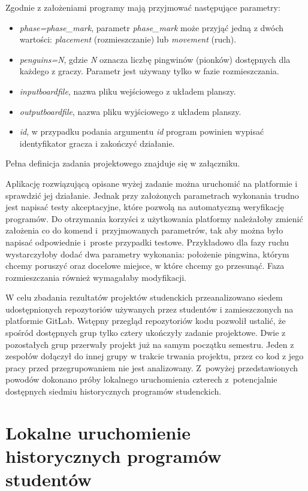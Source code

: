 Zgodnie z założeniami programy mają przyjmować następujące parametry:
\begin{itemize}
    \item \textit{phase=phase\_mark}, parametr \textit{phase\_mark} może przyjąć jedną z dwóch wartości: \textit{placement} (rozmieszczanie) lub \textit{movement} (ruch).
    \item \textit{penguins=N}, gdzie \textit{N} oznacza liczbę pingwinów (pionków) dostępnych dla każdego z graczy.
    Parametr jest używany tylko w fazie rozmieszczania.
    \item \textit{inputboardfile}, nazwa pliku wejściowego z układem planszy.
    \item \textit{outputboardfile}, nazwa pliku wyjściowego z układem planszy.
    \item \textit{id}, w przypadku podania argumentu \textit{id} program powinien wypisać identyfikator gracza i zakończyć działanie.
\end{itemize}
Pełna definicja zadania projektowego znajduje się w załączniku.

Aplikację rozwiązującą opisane wyżej zadanie można uruchomić na platformie i sprawdzić jej działanie.
Jednak przy założonych parametrach wykonania trudno jest napisać testy akceptacyjne, które pozwolą na automatyczną weryfikację programów.
Do otrzymania korzyści z użytkowania platformy należałoby zmienić założenia co do komend i~przyjmowanych parametrów, tak aby można było napisać odpowiednie i~proste przypadki testowe.
Przykładowo dla fazy ruchu wystarczyłoby dodać dwa parametry wykonania: położenie pingwina, którym chcemy poruszyć oraz docelowe miejsce, w które chcemy go przesunąć.
Faza rozmieszczania również wymagałaby modyfikacji.

W celu zbadania rezultatów projektów studenckich przeanalizowano siedem udostępnionych repozytoriów używanych przez studentów i zamieszczonych na platformie GitLab.
Wstępny przegląd repozytoriów kodu pozwolił ustalić, że spośród dostępnych grup tylko cztery ukończyły zadanie projektowe.
Dwie z pozostałych grup przerwały projekt już na samym początku semestru.
Jeden z zespołów dołączył do innej grupy w trakcie trwania projektu, przez co kod z jego pracy przed przegrupowaniem nie jest analizowany.
Z~powyżej przedstawionych powodów dokonano próby lokalnego uruchomienia czterech z~potencjalnie dostępnych siedmiu historycznych programów studenckich.

\section{Lokalne uruchomienie historycznych programów studentów}

